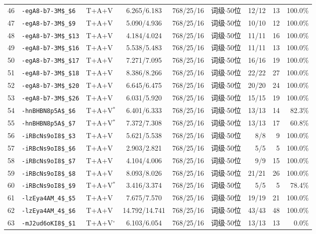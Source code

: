 \begin{longtable}{rllcccrrr}
46 & \texttt{-egA8-b7-3M\$\_\$6} & T+A+V & 6.265/6.183 & 768/25/16 & 词级$\cdot$50位 & 12/12 & 13 & 100.0\% \\
47 & \texttt{-egA8-b7-3M\$\_\$9} & T+A+V & 5.090/4.936 & 768/25/16 & 词级$\cdot$50位 & 10/10 & 12 & 100.0\% \\
48 & \texttt{-egA8-b7-3M\$\_\$13} & T+A+V & 4.184/4.024 & 768/25/16 & 词级$\cdot$50位 & 11/11 & 16 & 100.0\% \\
49 & \texttt{-egA8-b7-3M\$\_\$16} & T+A+V & 5.538/5.483 & 768/25/16 & 词级$\cdot$50位 & 11/11 & 13 & 100.0\% \\
50 & \texttt{-egA8-b7-3M\$\_\$17} & T+A+V & 7.271/7.095 & 768/25/16 & 词级$\cdot$50位 & 16/16 & 19 & 100.0\% \\
51 & \texttt{-egA8-b7-3M\$\_\$18} & T+A+V & 8.386/8.266 & 768/25/16 & 词级$\cdot$50位 & 22/22 & 27 & 100.0\% \\
52 & \texttt{-egA8-b7-3M\$\_\$20} & T+A+V & 6.645/6.475 & 768/25/16 & 词级$\cdot$50位 & 20/20 & 24 & 100.0\% \\
53 & \texttt{-egA8-b7-3M\$\_\$26} & T+A+V & 6.031/5.920 & 768/25/16 & 词级$\cdot$50位 & 15/15 & 19 & 100.0\% \\
54 & \texttt{-hnBHBN8p5A\$\_\$6} & T+A+V$^{*}$ & 6.401/6.333 & 768/25/16 & 词级$\cdot$50位 & 13/13 & 14 & 82.3\% \\
55 & \texttt{-hnBHBN8p5A\$\_\$7} & T+A+V$^{*}$ & 7.372/7.308 & 768/25/16 & 词级$\cdot$50位 & 13/13 & 17 & 60.8\% \\
56 & \texttt{-iRBcNs9oI8\$\_\$3} & T+A+V & 5.621/5.538 & 768/25/16 & 词级$\cdot$50位 & 8/8 & 9 & 100.0\% \\
57 & \texttt{-iRBcNs9oI8\$\_\$6} & T+A+V & 2.903/2.821 & 768/25/16 & 词级$\cdot$50位 & 5/5 & 5 & 100.0\% \\
58 & \texttt{-iRBcNs9oI8\$\_\$7} & T+A+V & 4.104/4.006 & 768/25/16 & 词级$\cdot$50位 & 9/9 & 15 & 100.0\% \\
59 & \texttt{-iRBcNs9oI8\$\_\$8} & T+A+V & 8.093/8.026 & 768/25/16 & 词级$\cdot$50位 & 21/21 & 26 & 100.0\% \\
60 & \texttt{-iRBcNs9oI8\$\_\$9} & T+A+V$^{*}$ & 3.416/3.374 & 768/25/16 & 词级$\cdot$50位 & 5/5 & 5 & 78.4\% \\
61 & \texttt{-lzEya4AM\_4\$\_\$5} & T+A+V & 7.675/7.570 & 768/25/16 & 词级$\cdot$50位 & 19/19 & 21 & 100.0\% \\
62 & \texttt{-lzEya4AM\_4\$\_\$6} & T+A+V & 14.792/14.741 & 768/25/16 & 词级$\cdot$50位 & 43/43 & 48 & 100.0\% \\
63 & \texttt{-mJ2ud6oKI8\$\_\$1} & T+A+V$^{\circ}$ & 6.103/6.054 & 768/25/16 & 词级$\cdot$50位 & 13/13 & 13 & 0.0\% \\

\end{longtable}
